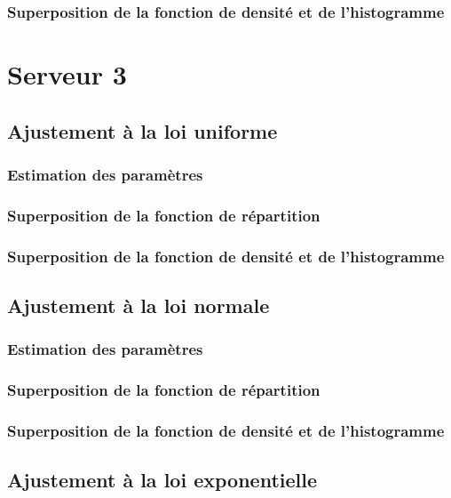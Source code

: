 \documentclass{article}
\begin{document}
\subsubsection{Superposition de la fonction de densité et de l'histogramme}

\section{Serveur 3}

\subsection{Ajustement à la loi uniforme}

\subsubsection{Estimation des paramètres}
\subsubsection{Superposition de la fonction de répartition}
\subsubsection{Superposition de la fonction de densité et de l'histogramme}

\subsection{Ajustement à la loi normale}

\subsubsection{Estimation des paramètres}
\subsubsection{Superposition de la fonction de répartition}
\subsubsection{Superposition de la fonction de densité et de l'histogramme}

\subsection {Ajustement à la loi exponentielle}
\end{document}

